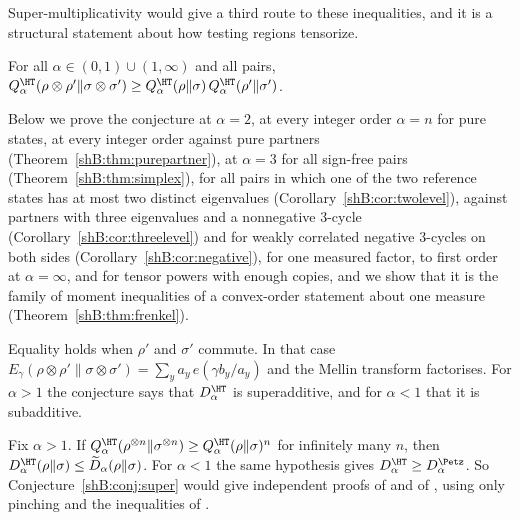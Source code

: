 Super-multiplicativity would give a third route to these inequalities, and it is a structural statement about how testing regions tensorize.

\begin{conjecture}\label{shB:conj:super}
For all $\alpha\in(0,1)\cup(1,\infty)$ and all pairs, $Q^\HT_\alpha(\rho\otimes\rho'\|\sigma\otimes\sigma')\ge Q^\HT_\alpha(\rho\|\sigma)\,Q^\HT_\alpha(\rho'\|\sigma')$.
\end{conjecture}

Below we prove the conjecture at $\alpha=2$, at every integer order $\alpha=n$ for pure states, at every integer order against pure partners (Theorem~\ref{shB:thm:purepartner}), at $\alpha=3$ for all sign-free pairs (Theorem~\ref{shB:thm:simplex}), for all pairs in which one of the two reference states has at most two distinct eigenvalues (Corollary~\ref{shB:cor:twolevel}), against partners with three eigenvalues and a nonnegative $3$-cycle (Corollary~\ref{shB:cor:threelevel}) and for weakly correlated negative $3$-cycles on both sides (Corollary~\ref{shB:cor:negative}), for one measured factor, to first order at $\alpha=\infty$, and for tensor powers with enough copies, and we show that it is the family of moment inequalities of a convex-order statement about one measure (Theorem~\ref{shB:thm:frenkel}).

Equality holds when $\rho'$ and $\sigma'$ commute. In that case $E_\gamma(\rho\otimes\rho'\|\sigma\otimes\sigma')=\sum_ya_y\,e(\gamma b_y/a_y)$ and the Mellin transform factorises. For $\alpha>1$ the conjecture says that $D^\HT_\alpha$ is superadditive, and for $\alpha<1$ that it is subadditive.

\begin{theorem}[Reduction]\label{shB:thm:reduction}
Fix $\alpha>1$. If $Q^\HT_\alpha(\rho^{\otimes n}\|\sigma^{\otimes n})\ge Q^\HT_\alpha(\rho\|\sigma)^n$ for infinitely many $n$, then $D^\HT_\alpha(\rho\|\sigma)\le\widetilde D_\alpha(\rho\|\sigma)$. For $\alpha<1$ the same hypothesis gives $D^\HT_\alpha\ge D^\Petz_\alpha$. So Conjecture~\ref{shB:conj:super} would give independent proofs of \cite{LiuHircheCheng2025} and of \cite[(1.10)]{BeigiHircheTomamichel2025}, using only pinching and the inequalities of \cite{AudenaertChernoff2007}.
\end{theorem}

